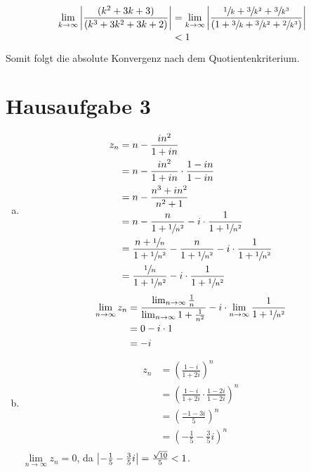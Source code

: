 \documentclass{article}
\begin{document}
\begin{align*}
  \lim_{k \to \infty} \abs{\frac{ (k^2 + 3k + 3) }{ (k^3 + 3k^2 + 3k + 2) }}
  &= \lim_{k \to \infty} \abs{\frac{ \sfrac{1}{k} + \sfrac{3}{k^2} + \sfrac{3}{k^3} }{ (1 + \sfrac{3}{k} + \sfrac{3}{k^2} + \sfrac{2}{k^3}) }} \\
  &< 1 
\end{align*}

Somit folgt die absolute Konvergenz nach dem Quotientenkriterium.

\section*{Hausaufgabe 3}

\begin{enumerate}[a)]
\item
  \begin{align*}
    z_n &= n - \frac{in^2}{1 + in} \\
        &= n - \frac{in^2}{1 + in} \cdot \frac{1 - in}{1 - in} \\
        &= n - \frac{n^3 + in^2}{n^2 + 1} \\
        &= n - \frac{n}{1 + \sfrac{1}{n^2}} - i \cdot \frac{1}{1 + \sfrac{1}{n^2}}  \\
        &= \frac{n + \sfrac{1}{n}}{1 + \sfrac{1}{n^2}} - \frac{n}{1 + \sfrac{1}{n^2}} -i \cdot \frac{1}{1 + \sfrac{1}{n^2}} \\
        &= \frac{\sfrac{1}{n}}{1 + \sfrac{1}{n^2}} - i \cdot \frac{1}{1 + \sfrac{1}{n^2}}
  \end{align*}
  \begin{align*}
    \lim_{n\to\infty} z_n &= \frac{\lim_{n\to\infty} \frac{1}{n}}{\lim_{n\to\infty} 1 + \frac{1}{n^2}} - i \cdot  \lim_{n\to\infty} \frac{1}{1 + \sfrac{1}{n^2}} \\
                          &= 0  - i \cdot 1 \\
                          &= - i
  \end{align*}
\item
  \begin{align*}
    z_n &= \left( \frac{1 - i}{1 + 2i}\right)^n \\
        &= \left( \frac{1 - i}{1 + 2i} \cdot \frac{1 - 2i}{1 - 2i} \right)^n \\
        &= \left( \frac{-1 - 3i}{5}\right)^n \\
        &= \left( -\frac{1}{5} - \frac{3}{5}i\right)^n \\
  \end{align*}
  $\underset{n\to\infty}\lim z_n = 0$, da $\abs{-\frac{1}{5} - \frac{3}{5}i} = \frac{\sqrt{10}}{5} < 1$.
\end{enumerate}
\end{document}
